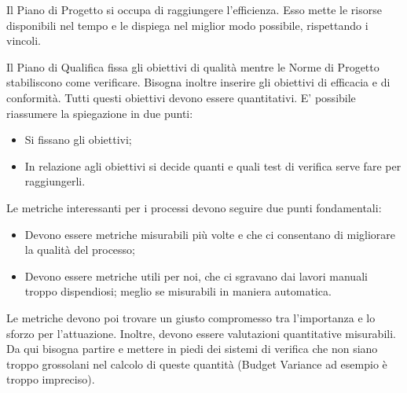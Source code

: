 Il Piano di Progetto si occupa di raggiungere l'efficienza. Esso mette le risorse disponibili
nel tempo e le dispiega nel miglior modo possibile, rispettando i vincoli.

Il Piano di Qualifica fissa gli obiettivi di qualità mentre le Norme di Progetto stabiliscono
come verificare. Bisogna inoltre inserire gli obiettivi di efficacia e di
conformità. Tutti questi obiettivi devono essere quantitativi.
E' possibile riassumere la spiegazione in due punti:
\begin{itemize}
\item Si fissano gli obiettivi;
\item In relazione agli obiettivi si decide quanti e quali test di verifica serve fare per raggiungerli.
\end{itemize}

Le metriche interessanti per i processi devono seguire due punti fondamentali:
\begin{itemize}
\item Devono essere metriche misurabili più volte e che ci consentano di migliorare la qualità del processo;
\item Devono essere metriche utili per noi, che ci sgravano dai lavori manuali troppo dispendiosi; meglio se misurabili in maniera automatica. 
\end{itemize}
Le metriche devono poi trovare un giusto compromesso tra l'importanza e lo sforzo per
l'attuazione. Inoltre, devono essere valutazioni quantitative misurabili. Da qui bisogna
partire e mettere in piedi dei sistemi di verifica che non siano troppo grossolani nel
calcolo di queste quantità (Budget Variance ad esempio è troppo impreciso).
